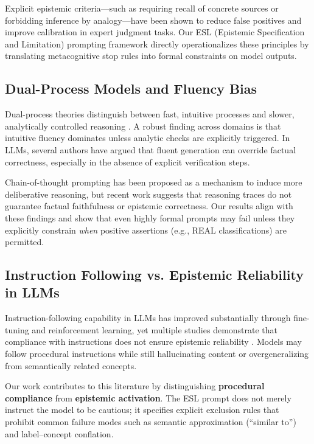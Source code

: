 Explicit epistemic criteria---such as requiring recall of concrete sources or forbidding inference by analogy---have been shown to reduce false positives and improve calibration in expert judgment tasks. Our ESL (Epistemic Specification and Limitation) prompting framework directly operationalizes these principles by translating metacognitive stop rules into formal constraints on model outputs.


\subsection{Dual-Process Models and Fluency Bias}

Dual-process theories distinguish between fast, intuitive processes and slower, analytically controlled reasoning \citep{evans2013dual, kahneman2011thinking}. A robust finding across domains is that intuitive fluency dominates unless analytic checks are explicitly triggered. In LLMs, several authors have argued that fluent generation can override factual correctness, especially in the absence of explicit verification steps.

Chain-of-thought prompting has been proposed as a mechanism to induce more deliberative reasoning, but recent work suggests that reasoning traces do not guarantee factual faithfulness or epistemic correctness. Our results align with these findings and show that even highly formal prompts may fail unless they explicitly constrain \emph{when} positive assertions (e.g., REAL classifications) are permitted.


\subsection{Instruction Following vs. Epistemic Reliability in LLMs}

Instruction-following capability in LLMs has improved substantially through fine-tuning and reinforcement learning, yet multiple studies demonstrate that compliance with instructions does not ensure epistemic reliability \citep{ji2023survey}. Models may follow procedural instructions while still hallucinating content or overgeneralizing from semantically related concepts.

Our work contributes to this literature by distinguishing \textbf{procedural compliance} from \textbf{epistemic activation}. The ESL prompt does not merely instruct the model to be cautious; it specifies explicit exclusion rules that prohibit common failure modes such as semantic approximation (``similar to'') and label--concept conflation.



